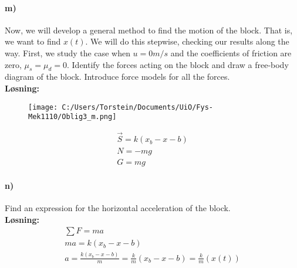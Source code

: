 \documentclass[11pt, A4paper,norsk]{article}
\begin{document}
		\paragraph{m)}
			\begin{flushleft}
Now, we will develop a general method to find the motion of the block. That is, we want to find $x(t)$. We will do this stepwise, checking our results along the way. First, we study the case when $u = 0m/s$ and the coefficients of friction are zero, $\mu_s = \mu_d = 0$. 
Identify the forces acting on the block and draw a free-body diagram of the block. Introduce force models for all the forces. \\
\vspace{1mm}
\textbf{Løsning:} \\
\vspace{1mm}
				\begin{figure}[H]
\texttt{[image: C:/Users/Torstein/Documents/UiO/Fys-Mek1110/Oblig3\_m.png]}
				\end{figure}
				\begin{align}
\vec{S} = k(x_b - x - b) \\
N = -mg \\
G = mg
				\end{align}
			\end{flushleft}









		\paragraph{n)}
			\begin{flushleft}
Find an expression for the horizontal acceleration of the block. \\
\vspace{1mm}
\textbf{Løsning:} \\
\vspace{1mm}
				\begin{align}
\sum F = ma \\
ma = k(x_b - x - b) \\
a = \frac{k(x_b - x - b)}{m} = \frac{k}{m}(x_b - x - b) = \frac{k}{m}(x(t))
				\end{align}
			\end{flushleft}
\end{document}

